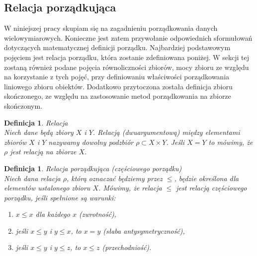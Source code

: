 \documentclass[12pt,a4paper]{report}
\newtheorem{definition}[theorem]{Definicja}
\begin{document}
\subsection{Relacja porządkująca}
\noindent

W niniejszej pracy skupiam się na zagadnieniu porządkowania danych wielowymiarowych. Konieczne jest zatem przywołanie odpowiednich sformułowań dotyczących matematycznej definicji porządku. Najbardziej podstawowym pojęciem jest relacja porządku, która zostanie zdefiniowana poniżej. W sekcji tej zostaną również podane pojęcia równoliczności zbiorów, mocy zbioru ze względu na korzystanie z tych pojęć, przy definiowaniu właściwości porządkowania liniowego zbioru obiektów. Dodatkowo przytoczona została definicja zbioru skończonego, ze względu na   zastosowanie metod porządkowania na zbiorze skończonym.


\begin{definition}{Relacja \cite[Rozdział 3]{kuratowski2004}\\}
Niech dane będą zbiory $X$ i $Y$. Relacją (dwuargumentową) między elementami zbiorów $X$ i $Y$ nazywamy dowolny podzbiór $\rho \subset X \times Y $. Jeśli $X=Y$ to mówimy, że $\rho$ jest relacją na zbiorze $X$. \\
\end{definition} 

\begin{definition}{Relacja porządkująca (częściowego porządku) \cite[Rozdział 2]{blaszczyk2007}\\}\label{def-relacja-czesciowego-porzadku}
Niech dana relacja $\rho$, którą oznaczać będziemy przez $\leq$, będzie określona dla elementów ustalonego zbioru $X$. Mówimy, że relacja $\leq$ jest relacją częściowego porządku, jeśli spełnione są warunki:
\begin{enumerate}
\item $x \leq x$ dla każdego $x$ (zwrotność),
\item jeśli $x \leq y$ i $y \leq x$, to $x=y$ (słaba antysymetryczność),
\item jeśli $x \leq y$ i $y \leq z$, to $x \leq z$ (przechodniość).\\
\end{enumerate}
\end{definition}
\end{document}
